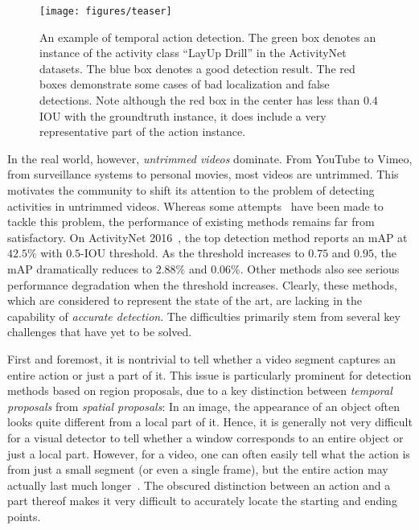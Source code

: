\documentclass[10pt,twocolumn,letterpaper]{article}
\begin{document}
 
\begin{figure}
\centering
\texttt{[image: figures/teaser]}
\caption{An example of temporal action detection. The green box denotes an instance of the activity class ``LayUp Drill'' in the ActivityNet~\cite{caba2015activitynet} datasets.
	The blue box denotes a good detection result. The red boxes demonstrate some cases of bad localization and false detections.
	Note although the red box in the center has less than  $ 0.4 $ IOU with the groundtruth instance, it does include a very representative part of the action instance.}
\label{fig:teaser}
\end{figure}

In the real world, however, \emph{untrimmed videos} dominate. 
From YouTube to Vimeo, from surveillance systems to personal movies, 
most videos are untrimmed. 
This motivates the community to shift its attention to the problem
of detecting activities in untrimmed videos.
Whereas some attempts~\cite{Yeung2016FrameGlimpse,Yuan2016ScorePyramids}
have been made to tackle this problem, 
the performance of existing methods remains far from satisfactory. 
On ActivityNet 2016~\cite{caba2015activitynet}, the top detection method
reports an mAP at $42.5\%$ with $0.5$-IOU threshold.
As the threshold increases to $0.75$ and $0.95$, the mAP dramatically
reduces to $2.88\%$ and $0.06\%$. 
Other methods also see serious performance degradation when the threshold increases.
Clearly, these methods, which are considered to represent
the state of the art, are lacking in the capability of \emph{accurate detection}. 
The difficulties primarily stem from several key challenges
that have yet to be solved. 

First and foremost, it is nontrivial to tell whether a video segment
captures an entire action or just a part of it.  
This issue is particularly prominent for detection methods based on region proposals,
due to a key distinction between \emph{temporal proposals} from \emph{spatial proposals}:
In an image, the appearance of an object often looks quite different 
from a local part of it. Hence, it is generally not very difficult for a visual detector
to tell whether a window corresponds to an entire object or just a local part. 
However, for a video, one can often easily tell what the action is from just a small segment
(or even a single frame), but the entire action may actually last much longer~\cite{Schindler2008Snippet}. 
The obscured distinction between an action and a part thereof makes it very difficult to 
accurately locate the starting and ending points. 
\end{document}
